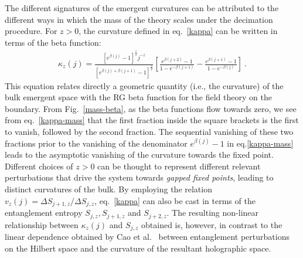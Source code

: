The different signatures of the emergent curvatures can be attributed to the different ways in which the mass of the theory scales under the decimation procedure. For \(z>0\), the curvature defined in eq.~\eqref{kappa} can be written in terms of the beta function:
\begin{equation}\begin{aligned}
	\label{kappa-mass}
	\kappa_z(j) = \frac{\left[e^{\beta(j)} - 1\right]^\frac{1}{2} j^{-z}}{\left[e^{\beta(j) + \beta(j+1)} - 1\right]^{\frac{3}{2}}}\left[\frac{e^{\beta(j+2)} - 1}{1 - e^{-\beta(j+1)}} - \frac{e^{\beta(j+1)} - 1}{1 - e^{-\beta(j)}}\right]~.
\end{aligned}\end{equation}
This equation relates directly a geometric quantity (i.e., the curvature) of the bulk emergent space with the RG beta function for the field theory on the boundary. From Fig.~\ref{mass-beta}, as the beta functions flow towards zero, we see from eq.~\eqref{kappa-mass} that the first fraction inside the square brackets is the first to vanish, followed by the second fraction. The sequential vanishing of these two fractions prior to the vanishing of the denominator \(e^{\beta(j)} - 1\) in eq.\eqref{kappa-mass} leads to the asymptotic vanishing of the curvature towards the fixed point. Different choices of \(z >0\) can be thought to represent different relevant perturbations that drive the system towards {\it gapped fixed points}, leading to distinct curvatures of the bulk. By employing the relation \(v_z(j)=\Delta S_{j+1,z}/\Delta S_{j,z}\), eq.~\eqref{kappa} can also be cast in terms of the entanglement entropy \(S_{j,z}, S_{j+1,z}\) and \(S_{j+2,z}\). The resulting non-linear relationship between $\kappa_{z}(j)$ and $S_{j,z}$ obtained is, however, in contrast to the linear dependence obtained by Cao et al.~\cite{cao_2017} between entanglement perturbations on the Hilbert space and the curvature of the resultant holographic space.

